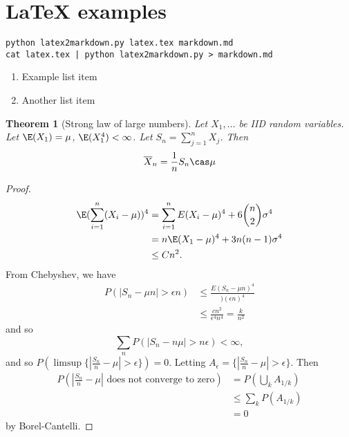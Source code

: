 \documentclass[12pt]{amsart}
\theoremstyle{plain}%
\newtheorem{thm}{Theorem}[section]
\begin{document}
\section{LaTeX examples}

\begin{lstlisting}
python latex2markdown.py latex.tex markdown.md
cat latex.tex | python latex2markdown.py > markdown.md
\end{lstlisting}

\begin{enumerate}
    \item Example list item
    \item Another list item
\end{enumerate}

\begin{thm}[Strong law of large numbers]  Let $X_1, \dots$ be IID random variables.  Let $\E(X_1) = \mu$, $\E(X_1^4) < \infty$.  Let $S_n = \sum_{j=1}^n X_j$.  Then \[
    \overline X_n = \frac{1}{n} S_n \cas \mu 
\]
\end{thm}

\begin{proof}
    \begin{align*}
        \E(\sum_{i=1}^n (X_i - \mu))^4 &= \sum_{i=1}^n E(X_i - \mu)^4 + 6 {n \choose 2} \sigma^4 \\
        &= n \E(X_1 - \mu)^4 + 3n(n-1) \sigma^4 \\
        &\leq Cn^2. 
    \end{align*}
    From Chebyshev, we have 
    \begin{align*}
        P(| S_n - \mu n| > \epsilon n) &\leq \frac{E(S_n - \mu n)^4}{)(\epsilon n)^4} \\
                &\leq \frac{cn^2}{\epsilon^4 n^4} = \frac{k}{n^2} 
    \end{align*}
    and so \[
        \sum_n P(|S_n - n \mu| > n \epsilon) < \infty,  \]
    and so $P(\limsup \{ | \frac{S_n}{n} - \mu | > \epsilon \} ) = 0$.  Letting $A_\epsilon = \{ | \frac{S_n}{n} - \mu | > \epsilon \}$.  Then 
    \begin{align*}
        P(|\frac{S_n}{n} - \mu | \text{ does not converge to zero}) &= P(\bigcup_k A_{1/k}) \\
        &\leq \sum_{k} P(A_{1/k}) \\
        &= 0
    \end{align*} by Borel-Cantelli.
\end{proof}
\end{document}

